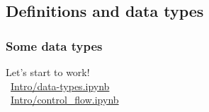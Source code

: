 \subsection{Definitions and data types}

%
%


\begin{frame}[c]
\frametitle{Some data types}

Let's start to work!\\
\faLink~\href{../notebooks/Intro/data-types.ipynb}{Intro/data-types.ipynb}\\
\faLink~\href{../notebooks/Intro/control_flow.ipynb}{Intro/control\_flow.ipynb}

\end{frame}

